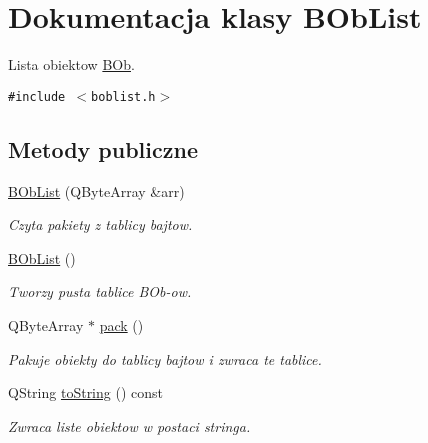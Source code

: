 \hypertarget{class_b_ob_list}{
\section{Dokumentacja klasy BObList}
\label{class_b_ob_list}
}
Lista obiektow \hyperlink{class_b_ob}{BOb}.  


{\tt \#include $<$boblist.h$>$}

\subsection*{Metody publiczne}
\begin{CompactItemize}
\item 
\hyperlink{class_b_ob_list_f7a55be345796f510a836c0696513f6e}{BObList} (QByteArray \&arr)
\begin{CompactList}\small\item\em Czyta pakiety z tablicy bajtow. \item\end{CompactList}\item 
\hypertarget{class_b_ob_list_fcc5319572df6cf382c1fffb15b3d10c}{
\hyperlink{class_b_ob_list_fcc5319572df6cf382c1fffb15b3d10c}{BObList} ()}
\label{class_b_ob_list_fcc5319572df6cf382c1fffb15b3d10c}

\begin{CompactList}\small\item\em Tworzy pusta tablice BOb-ow. \item\end{CompactList}\item 
QByteArray $\ast$ \hyperlink{class_b_ob_list_dfa68bde6e6c3c6641735fb552a76d80}{pack} ()
\begin{CompactList}\small\item\em Pakuje obiekty do tablicy bajtow i zwraca te tablice. \item\end{CompactList}\item 
\hypertarget{class_b_ob_list_273423dd42fb635bab24694b569bbe21}{
QString \hyperlink{class_b_ob_list_273423dd42fb635bab24694b569bbe21}{toString} () const }
\label{class_b_ob_list_273423dd42fb635bab24694b569bbe21}

\begin{CompactList}\small\item\em Zwraca liste obiektow w postaci stringa. \item\end{CompactList}\end{CompactItemize}



